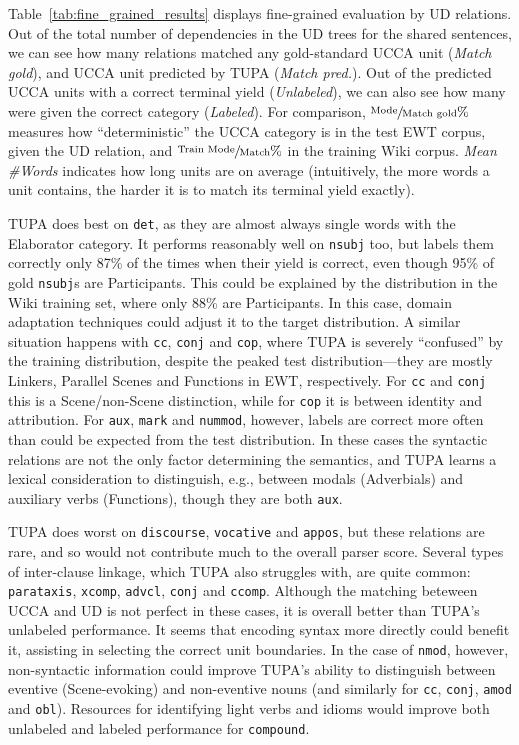 \documentclass[11pt,a4paper]{article}
\begin{document}
Table~\ref{tab:fine_grained_results} displays
fine-grained evaluation by UD relations.
Out of the total number of dependencies in the UD trees for the shared sentences,
we can see how many relations matched any gold-standard UCCA unit (\textit{Match gold}), and
UCCA unit predicted by TUPA (\textit{Match pred.}).
Out of the predicted UCCA units with a correct terminal yield (\textit{Unlabeled}),
we can also see how many were given the correct category (\textit{Labeled}).
For comparison, $\sfrac{\text{Mode}}{\text{Match gold}}\%$ measures how ``deterministic''
the UCCA category is in the test EWT corpus, given the UD relation,
and $\sfrac{\text{Train Mode}}{\text{Match}}\%$ in the training Wiki corpus.
\textit{Mean {\#}Words} indicates how long units are on average
(intuitively, the more words a unit contains, the harder it is to match its terminal yield exactly).

TUPA does best on \texttt{det},
as they are almost always single words with the Elaborator category.
It performs reasonably well on \texttt{nsubj} too,
but labels them correctly only 87\% of the times when their yield is correct,
even though 95\% of gold \texttt{nsubj}s are Participants.
This could be explained by the distribution in the Wiki training set,
where only 88\% are Participants.
In this case, domain adaptation techniques could adjust it to the target distribution.
A similar situation happens with \texttt{cc}, \texttt{conj} and \texttt{cop},
where TUPA is severely ``confused'' by the training distribution,
despite the peaked test distribution---they are mostly Linkers, Parallel Scenes
and Functions in EWT, respectively.
For \texttt{cc} and \texttt{conj} this is a Scene/non-Scene distinction,
while for \texttt{cop} it is between identity and attribution.
For \texttt{aux}, \texttt{mark} and \texttt{nummod}, however,
labels are correct more often than could be expected from the test distribution.
In these cases the syntactic relations are not the only factor determining
the semantics, and TUPA learns a lexical consideration to distinguish,
e.g., between modals (Adverbials) and auxiliary verbs (Functions),
though they are both \texttt{aux}.

TUPA does worst on \texttt{discourse}, \texttt{vocative} and \texttt{appos},
but these relations are rare,
and so would not contribute much to the overall parser score.
Several types of inter-clause linkage, which TUPA also struggles with,
are quite common: \texttt{parataxis}, \texttt{xcomp}, \texttt{advcl},
\texttt{conj} and \texttt{ccomp}.
Although the matching beteween UCCA and UD is not perfect in these cases,
it is overall better than TUPA's unlabeled performance.
It seems that encoding syntax more directly could benefit it,
assisting in selecting the correct unit boundaries.
In the case of \texttt{nmod}, however, non-syntactic information
could improve TUPA's ability to distinguish between eventive (Scene-evoking)
and non-eventive nouns
(and similarly for \texttt{cc}, \texttt{conj}, \texttt{amod} and \texttt{obl}).
Resources for identifying light verbs and idioms would improve
both unlabeled and labeled performance for \texttt{compound}.
\end{document}
